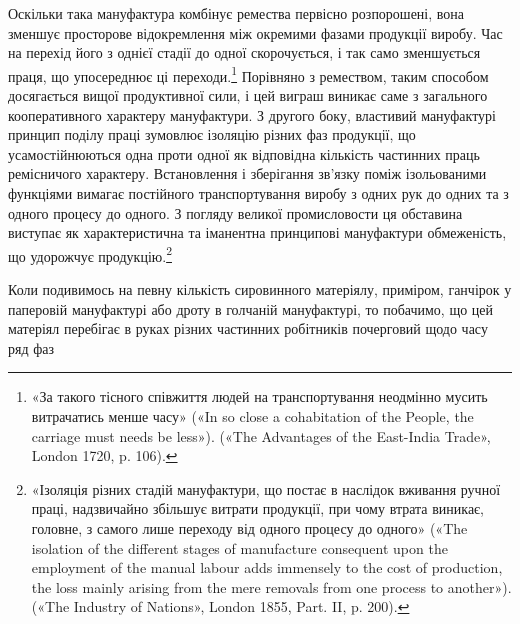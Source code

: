 Оскільки така мануфактура комбінує ремества первісно розпорошені,
вона зменшує просторове відокремлення між окремими
фазами продукції виробу. Час на перехід його з однієї
стадії до одної скорочується, і так само зменшується праця, що
упосереднює ці переходи.\footnote{
«За такого тісного співжиття людей на транспортування неодмінно
мусить витрачатись менше часу» («In so close a cohabitation
of the People, the carriage must needs be less»). («The Advantages of the
East-India Trade», London 1720, p. 106).
} Порівняно з ремеством, таким способом
досягається вищої продуктивної сили, і цей виграш виникає
саме з загального кооперативного характеру мануфактури.
З другого боку, властивий мануфактурі принцип поділу праці
зумовлює ізоляцію різних фаз продукції, що усамостійнюються
одна проти одної як відповідна кількість частинних праць ремісничого
характеру. Встановлення і зберігання зв’язку поміж
ізольованими функціями вимагає постійного транспортування
виробу з одних рук до одних та з одного процесу до одного.
З погляду великої промисловости ця обставина виступає як характеристична
та іманентна принципові мануфактури обмеженість,
що удорожчує продукцію.\footnote{
«Ізоляція різних стадій мануфактури, що постає в наслідок вживання
ручної праці, надзвичайно збільшує витрати продукції, при чому
втрата виникає, головне, з самого лише переходу від одного процесу
до одного» («The isolation of the different stages of manufacture consequent
upon the employment of the manual labour adds immensely to
the cost of production, the loss mainly arising from the mere removals from
one process to another»). («The Industry of Nations», London 1855,
Part. II, p. 200).
}

Коли подивимось на певну кількість сировинного матеріялу,
приміром, ганчірок у паперовій мануфактурі або дроту в голчаній
мануфактурі, то побачимо, що цей матеріял перебігає в руках
різних частинних робітників почерговий щодо часу ряд фаз
\parbreak{}  %
